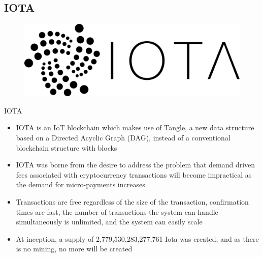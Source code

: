\documentclass[11pt]{beamer}
\begin{document}
\subsection{IOTA}

\begin{frame}
	\begin{figure}[]
		\centering
		\includegraphics  [scale=0.4]{Images/iota-logo}
	\end{figure}
\end{frame}


\begin{frame}{IOTA}
	\begin{itemize}
		\item IOTA is an IoT blockchain which makes use of Tangle, a new data structure based on a Directed Acyclic Graph (DAG), instead of a conventional blockchain structure  with blocks
		\item IOTA was borne from the desire to address the problem that demand driven fees associated with cryptocurrency transactions will become impractical as the demand for micro-payments increases
		\item Transactions are free regardless of the size of the transaction, confirmation times are fast, the number of transactions the system can handle simultaneously is unlimited, and the system can easily scale
		\item At inception, a supply of 2,779,530,283,277,761 Iota was created, and as there is no mining, no more will be created
	\end{itemize}
\end{frame}

\end{document}
